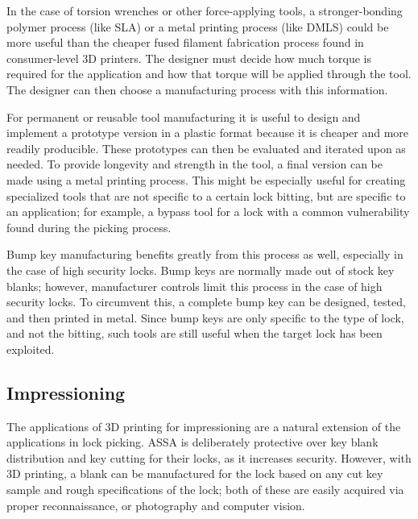 \documentclass{acm_proc_article-sp}
\begin{document}
In the case of torsion wrenches or other force-applying tools, a stronger-bonding polymer process (like SLA) or a metal printing process (like DMLS) could be more useful than the cheaper fused filament fabrication process found in consumer-level 3D printers. The designer must decide how much torque is required for the application and how that torque will be applied through the tool. The designer can then choose a manufacturing process with this information.

For permanent or reusable tool manufacturing it is useful to design and implement a prototype version in a plastic format because it is cheaper and more readily producible. These prototypes can then be evaluated and iterated upon as needed. To provide longevity and strength in the tool, a final version can be made using a metal printing process. This might be especially useful for creating specialized tools that are not specific to a certain lock bitting, but are specific to an application; for example, a bypass tool for a lock with a common vulnerability found during the picking process.

Bump key manufacturing benefits greatly from this process as well, especially in the case of high security locks. Bump keys are normally made out of stock key blanks; however, manufacturer controls limit this process in the case of high security locks. To circumvent this, a complete bump key can be designed, tested, and then printed in metal. Since bump keys are only specific to the type of lock, and not the bitting, such tools are still useful when the target lock has been exploited.

\subsection{Impressioning}
The applications of 3D printing for impressioning are a natural extension of the applications in lock picking. ASSA is deliberately protective over key blank distribution and key cutting for their locks, as it increases security. However, with 3D printing, a blank can be manufactured for the lock based on any cut key sample and rough specifications of the lock; both of these are easily acquired via proper reconnaissance, or photography and computer vision.
\end{document}
